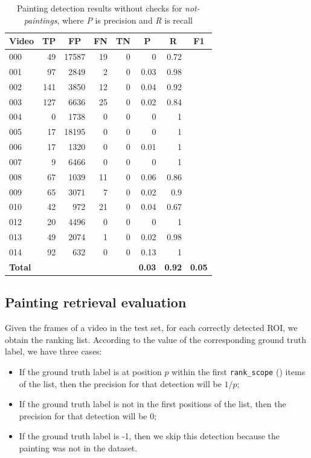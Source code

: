 \documentclass[10pt,twocolumn,letterpaper]{article}
\begin{document}
\begin{table}[]
\begin{center}
\begin{tabular}{lrrrrrrr}
\multicolumn{1}{c}{\textbf{Video}} & \multicolumn{1}{c}{\textbf{TP}} & \multicolumn{1}{c}{\textbf{FP}} & \multicolumn{1}{c}{\textbf{FN}} & \multicolumn{1}{c}{\textbf{TN}} & \multicolumn{1}{c}{\textbf{P}} & \multicolumn{1}{c}{\textbf{R}} & \multicolumn{1}{c}{\textbf{F1}} \\ \hline \hline
000 & 49 & 17587 & 19 & 0 & 0 & 0.72 &  \\
001 & 97 & 2849 & 2 & 0 & 0.03 & 0.98 &  \\
002 & 141 & 3850 & 12 & 0 & 0.04 & 0.92 &  \\
003 & 127 & 6636 & 25 & 0 & 0.02 & 0.84 &  \\
004 & 0 & 1738 & 0 & 0 & 0 & 1 &  \\
005 & 17 & 18195 & 0 & 0 & 0 & 1 &  \\
006 & 17 & 1320 & 0 & 0 & 0.01 & 1 &  \\
007 & 9 & 6466 & 0 & 0 & 0 & 1 &  \\
008 & 67 & 1039 & 11 & 0 & 0.06 & 0.86 &  \\
009 & 65 & 3071 & 7 & 0 & 0.02 & 0.9 &  \\
010 & 42 & 972 & 21 & 0 & 0.04 & 0.67 &  \\
012 & 20 & 4496 & 0 & 0 & 0 & 1 &  \\
013 & 49 & 2074 & 1 & 0 & 0.02 & 0.98 &  \\
014 & 92 & 632 & 0 & 0 & 0.13 & 1 &  \\ \hline \hline
\textbf{Total} &  &  &  &  & \textbf{0.03} & \textbf{0.92} & \textbf{0.05} \\
\end{tabular}
\end{center}
\caption{Painting detection results without checks for \textit{not-paintings}, where \textit{P} is precision and \textit{R} is recall}
\label{tab:PaintingDetectionResults2}
\end{table}

\subsection{Painting retrieval evaluation}
\label{subsec:PaintingRetrievalEvaluation}
Given the frames of a video in the test set, for each correctly detected ROI, we obtain the ranking list. According to the value of the corresponding ground truth label, we have three cases:
\begin{itemize}
    \item If the ground truth label is at position $p$ within the first \texttt{rank\_scope} () items of the list, then the precision for that detection will be $1/p$;
    \item If the ground truth label is not in the first  positions of the list, then the precision for that detection will be 0;
    \item If the ground truth label is -1, then we skip this detection because the painting was not in the dataset.
\end{itemize}
\end{document}
